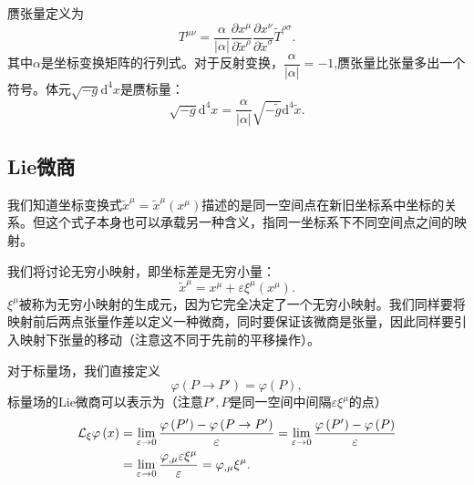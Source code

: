 \documentclass[11pt, a4paper, oneside, onecolumn]{ctexart}
\numberwithin{equation}{subsection}
\begin{document}
赝张量定义为
\begin{equation}
T^{\mu\nu}=\frac{\alpha}{\left\vert{}\alpha\right\vert{}}\frac{\partial{}x^{\mu}}{\partial{}\widetilde{x}^{\rho}}\frac{\partial{}x^{\nu}}{\partial{}\widetilde{x}^{\sigma}}\widetilde{T}^{\rho\sigma}.
\end{equation}
其中$\alpha$是坐标变换矩阵的行列式。对于反射变换，$\dfrac{\alpha}{\left\vert{}\alpha\right\vert{}}=-1$,赝张量比张量多出一个符号。体元$\sqrt{-g}\mathrm{d}^{4}x$是赝标量：
\begin{equation}
\sqrt{-g}\mathrm{d}^{4}x=\frac{\alpha}{\left\vert{}\alpha\right\vert{}}\sqrt{-\widetilde{g}}\mathrm{d}^{4}\widetilde{x}.
\end{equation}

\subsection{Lie微商}
我们知道坐标变换式$\widetilde{x}^{\mu}=\widetilde{x}^{\mu}\left(x^{\mu}\right)$描述的是同一空间点在新旧坐标系中坐标的关系。但这个式子本身也可以承载另一种含义，指同一坐标系下不同空间点之间的映射。

我们将讨论无穷小映射，即坐标差是无穷小量：
\begin{equation}
\widetilde{x}^{\mu}=x^{\mu}+\varepsilon\xi^{\mu}\left(x^{\mu}\right).
\end{equation}
$\xi^{\mu}$被称为无穷小映射的生成元，因为它完全决定了一个无穷小映射。我们同样要将映射前后两点张量作差以定义一种微商，同时要保证该微商是张量，因此同样要引入映射下张量的移动（注意这不同于先前的平移操作）。

对于标量场，我们直接定义
\begin{equation}
\varphi\left(P\to P'\right)=\varphi\left(P\right),
\end{equation}
标量场的Lie微商可以表示为（注意$P',P$是同一空间中间隔$\varepsilon\xi^{\mu}$的点）
\begin{align}
\mathcal{L}_{\xi}\varphi\left(x\right)&=\lim_{\varepsilon\to0}\frac{\varphi\left(P'\right)-\varphi\left(P\to P'\right)}{\varepsilon}=\lim_{\varepsilon\to0}\frac{\varphi\left(P'\right)-\varphi\left(P\right)}{\varepsilon}\notag\\
&=\lim_{\varepsilon\to0}\frac{\varphi_{,\mu}\varepsilon\xi^{\mu}}{\varepsilon}=\varphi_{,\mu}\xi^{\mu}.
\end{align}
\end{document}
